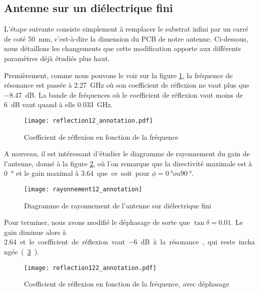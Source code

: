 
\subsection{Antenne sur un diélectrique fini}
L'étape suivante consiste simplement à remplacer le substrat infini par un carré de coté \SI{50}{\milli\meter}, c'est-à-dire la dimension du PCB de notre antenne. Ci-dessous, nous détaillons les changements que cette modification apporte aux différents paramètres déjà étudiés plus haut.

Premièrement, comme nous pouvons le voir sur la figure \ref{fig:reflection12_annotation}, la fréquence de résonance est passée à \SI{2.27}{\giga\hertz} où son coefficient de réflexion ne vaut plus que \SI{-8.47}{\deci\bel}. La bande de fréquences où le coefficient de réflexion vaut moins de \SI{6}{\deci\bel} vaut quand à elle \SI{0.033}{\giga\hertz}.
\begin{figure}[htbp]
\centering
\texttt{[image: reflection12\_annotation.pdf]}
\caption{Coefficient de réflexion en fonction de la fréquence\label{fig:reflection12_annotation}}
\end{figure}
A nouveau, il est intéressant d'étudier le diagramme de rayonnement du gain de l'antenne, donné à la figure \ref{fig:rayonnement12_annotation}, où l'on remarque que la directivité maximale est à  \SI{0}{\degree} et le gain maximal à \SI{3.64} que ce soit pour $\phi = \SI{0}{\degree} ou  \SI{90}{\degree}$.
\begin{figure}
\centering
\texttt{[image: rayonnement12\_annotation]}
\caption{Diagramme de rayonnement de l'antenne sur diélectrique fini}
\label{fig:rayonnement12_annotation}
\end{figure}
Pour terminer, nous avons modifié le déphasage de sorte que $\tan{\delta} = 0.01$. Le gain diminue alors à \SI{2.64} et le coefficient de réflexion vaut \SI{-6}{\deci\bel} à la résonance, qui reste inchangée. (\ref{fig:reflection122_annotation}).
\begin{figure}[htbp]
\centering
\texttt{[image: reflection122\_annotation.pdf]}
\caption{Coefficient de réflexion en fonction de la fréquence, avec déphasage}
\label{fig:reflection122_annotation}
\end{figure}


